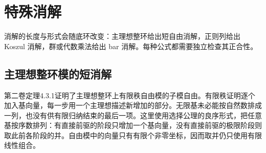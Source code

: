 
\section{特殊消解}
\label{b4:sec:0704}

消解的长度与形式会随底环改变：主理想整环给出短自由消解，正则列给出 Koszul 消解，群或代数乘法给出 bar 消解。每种公式都需要独立检查其正合性。


%
%
%

\subsection{主理想整环模的短消解}
\label{b4:subsec:0704:01}

第二卷定理4.3.1证明了主理想整环上有限秩自由模的子模自由。有限秩证明逐个加入基向量，每一步用一个主理想描述新增加的部分。无限基未必能按自然数排成一列，也没有供有限归纳结束的最后一项。这里使用选择公理的良序形式，把任意基按序数排列：有直接前驱的阶段只增加一个基向量，没有直接前驱的极限阶段则取此前各阶段的并。自由模中的向量只有有限个非零坐标，因而取并仍只使用有限线性组合。

